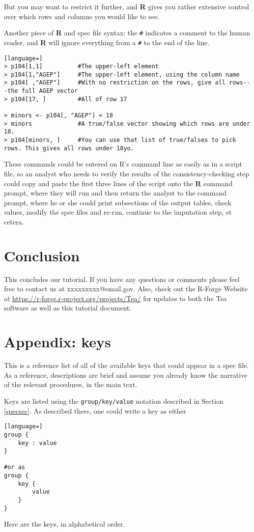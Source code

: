 \documentclass{article}
\begin{document}
But you may want to restrict it further, and \textbf{R} gives you rather extensive control over
which rows and columns you would like to see.

Another piece of \textbf{R} and spec file syntax: the {\tt \#} indicates a comment to the human
reader, and \textbf{R} will ignore everything from a {\tt \#} to the end of the line.

\begin{lstlisting}[language=]
> p104[1,1]          #The upper-left element
> p104[1,"AGEP"]     #The upper-left element, using the column name
> p104[ ,"AGEP"]     #With no restriction on the rows, give all rows---the full AGEP vector
> p104[17, ]         #All of row 17

> minors <- p104[, "AGEP"] < 18
> minors             #A true/false vector showing which rows are under 18.
> p104[minors, ]     #You can use that list of true/falses to pick rows. This gives all rows under 18yo.
\end{lstlisting}

These commands could be entered on R's command line as easily as in a script file, so an
analyst who needs to verify the results of the consistency-checking step could copy and
paste the first three lines of the script onto the \textbf{R} command prompt, where they will run and
then return the analyst to the command prompt, where he or she could print subsections of
the output tables, check values, modify the spec files and re-run, continue to the
imputation step, et cetera.


\section{Conclusion}
This concludes our tutorial. If you have any questions or comments please feel free to contact 
us at xxxxxxxxx@email.gov. Also, check out the R-Forge Website at 
\url{https://r-forge.r-project.org/projects/Tea/} for updates to both the Tea software as well 
as this tutorial document.

\section*{Appendix: keys}

This is a reference list of all of the available keys that could appear in a spec file.
As a reference, descriptions are brief and assume you already know the narrative of the
relevant procedures, in the main text.

Keys are listed using the {\tt group/key/value} notation described in Section \ref{specsec}. As described there, one could write a key as either
\begin{lstlisting}[language=]
group {
    key : value
}

#or as
group {
    key {
        value
    }
}
\end{lstlisting}

Here are the keys, in alphabetical order.



%
%
%
\end{document}
